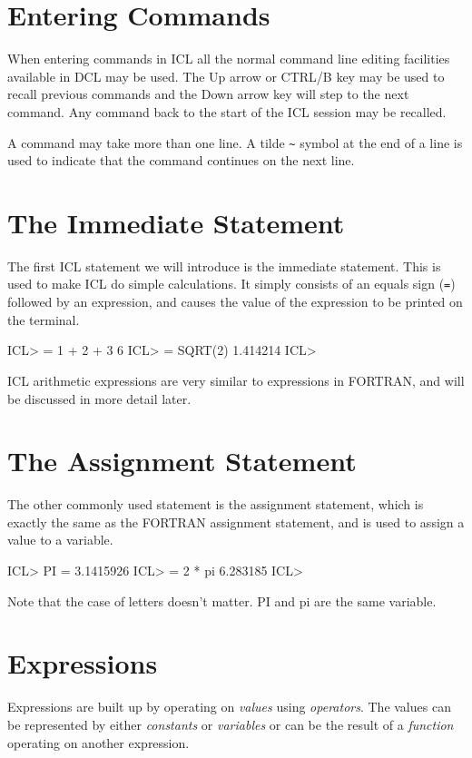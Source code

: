 \documentclass[twoside,11pt,nolof,chapters]{starlink}
\begin{document}
\section{Entering Commands}
When entering commands in ICL all the normal command line editing facilities
available in DCL may be used. The Up arrow or CTRL/B key may be used to recall
previous commands and the Down arrow key will step to the next command. Any
command back to the start of the ICL session may be recalled.

A command may take more than one line. A tilde \verb+~+ symbol at the end
of a line is used to indicate that the command continues on the next line.

\section{The Immediate Statement}
The first ICL statement we will introduce is the immediate statement. This
is used to make ICL do simple calculations. It simply consists of an
equals sign (\verb+=+) followed by an expression, and causes the value of
the expression to be printed on the terminal.
\begin{terminalv}
    ICL> = 1 + 2 + 3
             6
    ICL> = SQRT(2)
    1.414214
    ICL>
\end{terminalv}

ICL arithmetic expressions are very similar to expressions in FORTRAN, and
will be discussed in more detail later.
\section{The Assignment Statement}
The other commonly used statement is the assignment statement, which is
exactly the same as the FORTRAN assignment statement, and is used to
assign a value to a variable.
\begin{terminalv}
    ICL> PI = 3.1415926
    ICL> = 2 * pi
    6.283185
    ICL>
\end{terminalv}
Note that the case of letters doesn't matter. PI and pi are the same variable.
\section{Expressions}
Expressions are built up by operating on \emph{values} using \emph{operators}.
The values can be represented by either \emph{constants} or \emph{variables} or
can be the result of a \emph{function} operating on another expression.
\end{document}
